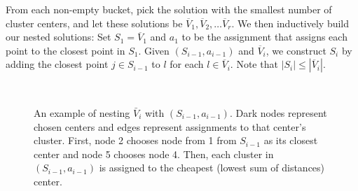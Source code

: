 \documentclass[conference, 10pt, final]{IEEEtran}
\begin{document}
From each non-empty bucket, pick the solution with the smallest number of cluster centers, and let these solutions be $\overline{V}_1, \overline{V}_2, \ldots \overline{V}_r$. We then inductively build our nested solutions: Set $S_1 = \overline{V}_1$ and $a_1$ to be the assignment that assigns each point to the closest point in $S_1$. Given $(S_{i-1}, a_{i-1})$ and $\overline{V}_i$, we construct $S_i$ by  adding the closest point $j \in S_{i-1}$ to $l$ for each $l \in \overline{V}_i$. Note that $|S_{i}| \leq |\overline{V}_i|$. 

\begin{figure}[!t]
\centering
{} \hspace{15mm}
 \\
  \hspace{15mm}
\caption{An example of nesting $\bar{V}_i$ with $(S_{i-1}, a_{i-1})$. Dark  nodes represent chosen centers and edges represent assignments to that center's cluster. First, node 2 chooses node from 1 from $S_{i-1}$ as its closest center and node 5 chooses node 4. Then, each cluster in $(S_{i-1}, a_{i-1})$ is assigned to the cheapest (lowest sum of distances) center.}
\label{fig_sim}
\end{figure}
\end{document}
